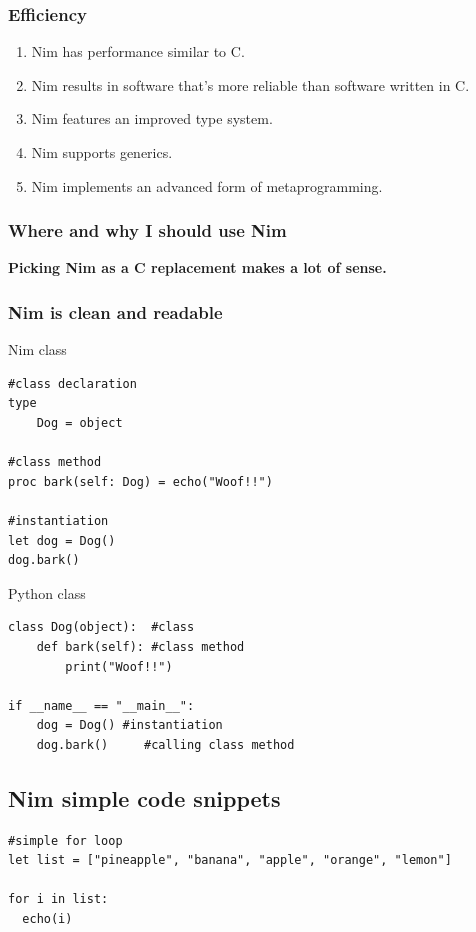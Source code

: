 \documentclass[10pt, a4paper, twocolumn]{article} %
\begin{document}
\subsubsection{Efficiency} 
\begin{enumerate}
	\item Nim has performance similar to C.
	\item Nim results in software that’s more reliable than software written in C. 
	\item Nim features an improved type system.
	\item Nim supports generics.
	\item Nim implements an advanced form of metaprogramming.
\end{enumerate}

\subsubsection{Where and why I should use Nim} 
\textbf{Picking Nim as a C replacement makes a lot of sense.}

\subsubsection{Nim is clean and readable}

Nim class
\begin{lstlisting}
#class declaration
type
    Dog = object

#class method
proc bark(self: Dog) = echo("Woof!!")

#instantiation
let dog = Dog()
dog.bark()
\end{lstlisting}

Python class 

\begin{lstlisting}
class Dog(object):	#class
    def bark(self):	#class method
        print("Woof!!")

if __name__ == "__main__":
    dog = Dog()	#instantiation
    dog.bark()	   #calling class method

\end{lstlisting}

\subsection{Nim simple code snippets}
\begin{lstlisting}
#simple for loop
let list = ["pineapple", "banana", "apple", "orange", "lemon"]

for i in list:
  echo(i)
\end{lstlisting}
\end{document}
